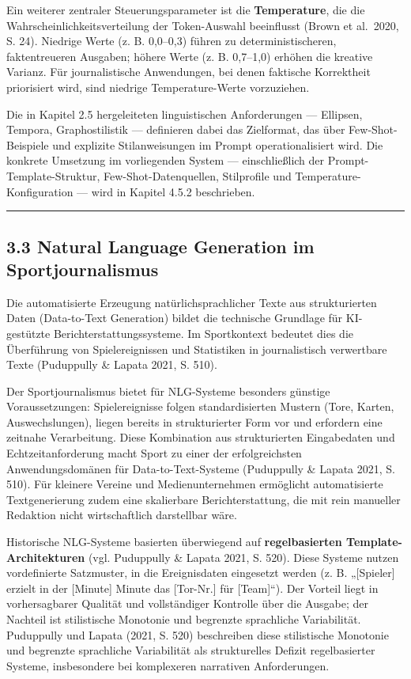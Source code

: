 Ein weiterer zentraler Steuerungsparameter ist die \textbf{Temperature},
die die Wahrscheinlichkeitsverteilung der Token-Auswahl beeinflusst
(Brown et al.~2020, S. 24). Niedrige Werte (z. B. 0,0--0,3) führen zu
deterministischeren, faktentreueren Ausgaben; höhere Werte (z. B.
0,7--1,0) erhöhen die kreative Varianz. Für journalistische Anwendungen,
bei denen faktische Korrektheit priorisiert wird, sind niedrige
Temperature-Werte vorzuziehen.

Die in Kapitel 2.5 hergeleiteten linguistischen Anforderungen ---
Ellipsen, Tempora, Graphostilistik --- definieren dabei das Zielformat,
das über Few-Shot-Beispiele und explizite Stilanweisungen im Prompt
operationalisiert wird. Die konkrete Umsetzung im vorliegenden System
--- einschließlich der Prompt-Template-Struktur, Few-Shot-Datenquellen,
Stilprofile und Temperature-Konfiguration --- wird in Kapitel 4.5.2
beschrieben.

\begin{center}\rule{0.5\linewidth}{0.5pt}\end{center}

\subsection{3.3 Natural Language Generation im
Sportjournalismus}\label{natural-language-generation-im-sportjournalismus}

Die automatisierte Erzeugung natürlichsprachlicher Texte aus
strukturierten Daten (Data-to-Text Generation) bildet die technische
Grundlage für KI-gestützte Berichterstattungssysteme. Im Sportkontext
bedeutet dies die Überführung von Spielereignissen und Statistiken in
journalistisch verwertbare Texte (Puduppully \& Lapata 2021, S. 510).

Der Sportjournalismus bietet für NLG-Systeme besonders günstige
Voraussetzungen: Spielereignisse folgen standardisierten Mustern (Tore,
Karten, Auswechslungen), liegen bereits in strukturierter Form vor und
erfordern eine zeitnahe Verarbeitung. Diese Kombination aus
strukturierten Eingabedaten und Echtzeitanforderung macht Sport zu einer
der erfolgreichsten Anwendungsdomänen für Data-to-Text-Systeme
(Puduppully \& Lapata 2021, S. 510). Für kleinere Vereine und
Medienunternehmen ermöglicht automatisierte Textgenerierung zudem eine
skalierbare Berichterstattung, die mit rein manueller Redaktion nicht
wirtschaftlich darstellbar wäre.

Historische NLG-Systeme basierten überwiegend auf \textbf{regelbasierten
Template-Architekturen} (vgl. Puduppully \& Lapata 2021, S. 520). Diese
Systeme nutzen vordefinierte Satzmuster, in die Ereignisdaten eingesetzt
werden (z. B. „{[}Spieler{]} erzielt in der {[}Minute{]} Minute das
{[}Tor-Nr.{]} für {[}Team{]}``). Der Vorteil liegt in vorhersagbarer
Qualität und vollständiger Kontrolle über die Ausgabe; der Nachteil ist
stilistische Monotonie und begrenzte sprachliche Variabilität.
Puduppully und Lapata (2021, S. 520) beschreiben diese stilistische
Monotonie und begrenzte sprachliche Variabilität als strukturelles
Defizit regelbasierter Systeme, insbesondere bei komplexeren narrativen
Anforderungen.

